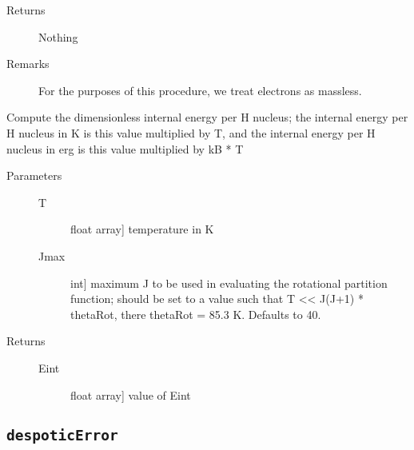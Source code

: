 \documentclass[letterpaper,10pt,english]{sphinxmanual}
\begin{document}
\begin{fulllineitems}
\begin{fulllineitems}
\begin{description}
\begin{description}
\end{description}

\item[{Returns}] \leavevmode
Nothing

\item[{Remarks}] \leavevmode
For the purposes of this procedure, we treat electrons as
massless.

\end{description}

\end{fulllineitems}


\begin{fulllineitems}
\label{fulldoc:despotic.composition.computeEint}
Compute the dimensionless internal energy per H nucleus; the internal
energy per H nucleus in K is this value multiplied by T, and
the internal energy per H nucleus in erg is this value
multiplied by kB * T
\begin{description}
\item[{Parameters}] \leavevmode\begin{description}
\item[{T}] \leavevmode{[}float \textbar{} array{]}
temperature in K

\item[{Jmax}] \leavevmode{[}int{]}
maximum J to be used in evaluating the rotational
partition function; should be set to a value such that T
\textless{}\textless{} J(J+1) * thetaRot, there thetaRot = 85.3 K. Defaults to
40.

\end{description}

\item[{Returns}] \leavevmode\begin{description}
\item[{Eint}] \leavevmode{[}float \textbar{} array{]}
value of Eint

\end{description}

\end{description}

\end{fulllineitems}


\end{fulllineitems}



\subsection{\texttt{despoticError}}
\label{fulldoc:despoticerror}
\end{document}
